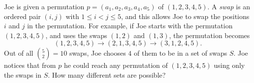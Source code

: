Joe is given a permutation $p = (a_1, a_2, a_3, a_4, a_{5})$ of $(1, 2, 3, 4, 5)$. A \emph{swap} is an ordered pair $(i, j)$ with $1 \le i < j \le 5$, and this allows Joe to swap the positions $i$ and $j$ in the permutation. For example, if Joe starts with the permutation $(1, 2, 3, 4, 5)$, and uses the swaps $(1, 2)$ and $(1, 3)$, the permutation becomes
\[(1, 2, 3, 4, 5) \rightarrow (2, 1, 3, 4, 5) \rightarrow (3, 1, 2, 4, 5). \]
Out of all $\binom{5}{2} = 10$ swaps, Joe chooses $4$ of them to be in a set of swaps $S$. Joe notices that from $p$ he could reach any permutation of $(1, 2, 3, 4, 5)$ using only the swaps in $S$. How many different sets are possible?
